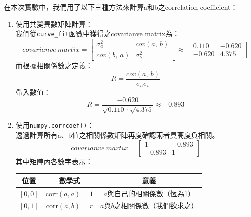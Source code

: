 \documentclass[12pt,a4paper]{article}
\begin{document}
\begin{CJK}{UTF8}{bkai}
\begin{itemize}
    在本次實驗中，我們用了以下三種方法來計算a和b之correlation coefficient：
    \begin{enumerate}
        \item 使用共變異數矩陣計算：\\我們從\texttt{curve\_fit}函數中獲得之covarianve matrix為：
        \begin{equation}
            covarianve\ martix=\left[
            \begin{array}{cc}
                 \sigma_a^2&cov(a,\ b)  \\
                 cov(b,\ a)&\sigma_b^2 
            \end{array}
            \right]\approx\left[
            \begin{array}{cc}
                 0.110&-0.620  \\
                 -0.620&4.375 
            \end{array}
            \right]
            \nonumber
        \end{equation}
        而根據相關係數之定義：
        \begin{equation}
            R=\frac{cov(a,\ b)}{\sigma_a\sigma_b}
            \nonumber
        \end{equation}
        帶入數值：
        \begin{equation}
            R=\frac{-0.620}{\sqrt{0.110}\cdot \sqrt{4.375}}\approx-0.893
            \nonumber
        \end{equation}
        \item 使用\texttt{numpy.corrcoef()}：\\透過計算所有a、b值之相關係數矩陣再度確認兩者具高度負相關。
        \begin{equation}
            covarianve\ martix=\left[
            \begin{array}{cc}
                 1&-0.893  \\
                 -0.893&1 
            \end{array}
            \right]
            \nonumber
        \end{equation}
        \clearpage
        其中矩陣內各數字表示：
       \begin{table}[h]
    \centering
    \begin{tabular}{|c|c|c|}
        \hline
        位置 & 數學式 & 意義 \\
        \hline
        $[0, 0]$ & $\mathrm{corr}(a, a) = 1$ & $a$與自己的相關係數（恆為1） \\
        \hline
        $[0, 1]$ & $\mathrm{corr}(a, b) = r$ & $a$與$b$之相關係數（我們欲求之） \\

\end{tabular}
\end{table}
\end{enumerate}
\end{itemize}
\end{CJK}
\end{document}
